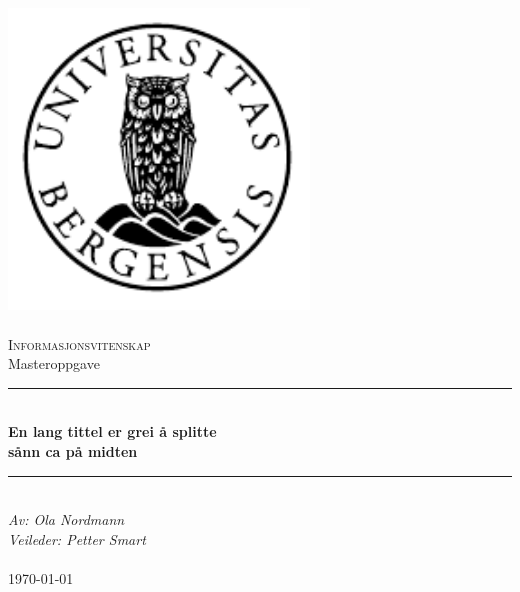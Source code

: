 \documentclass[12pt]{article}
\begin{document}
\maketitle

\newcommand{\blankpage}{\newpage{}\thispagestyle{empty}\mbox{}\newpage{}}
\newcommand{\HRule}{\rule{\linewidth}{0.5mm}}

\begin{titlepage}
\begin{center}
\includegraphics[width=8cm]{uib-emblem-svart} \\[0.5cm]
\paragraph*{}

\textsc{\Large Informasjonsvitenskap}\\[0.5cm]
\Large Masteroppgave \\[0.4cm]
\HRule \\[0.4cm]
{ \huge \bfseries En lang tittel er grei å splitte  \\ sånn ca på midten}\\[0.5cm]
\HRule \\[1.0cm]

\emph{Av: Ola Nordmann}\\
\emph{Veileder: Petter Smart}\\

\paragraph*{}
\end{center}
\vfill
\begin{center}
{\large \today}
\end{center}
\end{titlepage}
\end{document}
